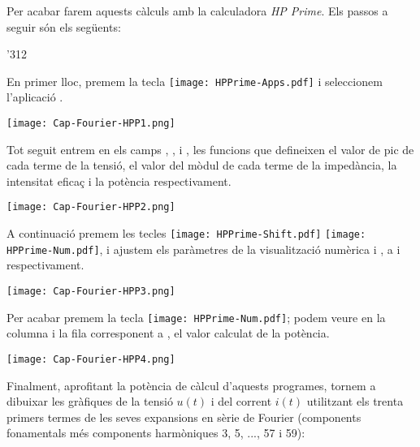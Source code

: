 \begin{exemple}
    \hspace{1cm}

    \hspace{1cm}\newline


    Per acabar farem aquests càlculs amb la calculadora \emph{HP Prime}.
     Els passos a seguir són els següents:

    \begin{dingautolist}{'312}

        \item En primer lloc, premem la tecla \texttt{[image: HPPrime-Apps.pdf]} i seleccionem l'aplicació .

             \texttt{[image: Cap-Fourier-HPP1.png]}

        \item Tot seguit entrem en els camps , ,  i , les funcions que defineixen el valor de pic de cada terme de la tensió,  el valor del mòdul de cada terme de la impedància,  la intensitat eficaç i la potència respectivament.

            \texttt{[image: Cap-Fourier-HPP2.png]}

        \item  A continuació premem les tecles \texttt{[image: HPPrime-Shift.pdf]} \texttt{[image: HPPrime-Num.pdf]}, i ajustem els paràmetres de la visualització numèrica  i , a  i  respectivament.

            \texttt{[image: Cap-Fourier-HPP3.png]}

        \item Per acabar premem la tecla \texttt{[image: HPPrime-Num.pdf]}; podem veure en la columna  i la fila corresponent a , el valor calculat de la potència.

            \texttt{[image: Cap-Fourier-HPP4.png]}

    \end{dingautolist}

    Finalment, aprofitant la potència de càlcul d'aquests programes, tornem a dibuixar les gràfiques de la tensió $u(t)$ i del corrent $i(t)$ utilitzant els trenta primers termes de les seves expansions en sèrie de Fourier (components fonamentals més components harmòniques 3, 5, ..., 57 i 59):
    \vspace{-2mm}
    \begin{center}
      
    \end{center}


\end{exemple}
